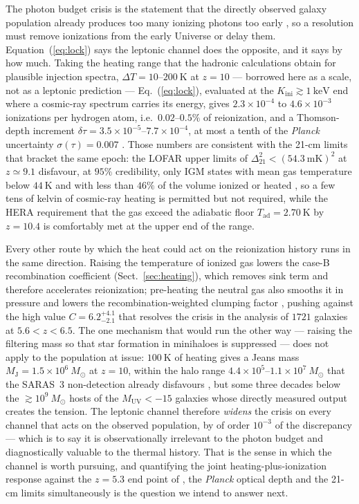 \documentclass[twocolumn]{article}
\newcommand{\Kini}{K_{\mathrm{ini}}}
\begin{document}
The photon budget crisis is the statement that the directly observed galaxy
population already produces too many ionizing photons too early
\citep{Munoz2024}, so a resolution must remove ionizations from the early
Universe or delay them. Equation~(\ref{eq:lock}) says the leptonic channel does
the opposite, and it says by how much. Taking the heating range that the
hadronic calculations obtain for plausible injection spectra,
$\Delta T = 10$--$200\ \mathrm{K}$ at $z = 10$ \citep{Leite2017} --- borrowed
here as a scale, not as a leptonic prediction --- Eq.~(\ref{eq:lock}),
evaluated at the $\Kini \gtrsim 1\ \mathrm{keV}$ end where a cosmic-ray
spectrum carries its energy, gives
$2.3\times10^{-4}$ to $4.6\times10^{-3}$ ionizations per hydrogen atom, i.e.\
$0.02$--$0.5\%$ of reionization, and a Thomson-depth increment
$\delta\tau = 3.5\times10^{-5}$--$7.7\times10^{-4}$, at most a tenth of the
\emph{Planck} uncertainty $\sigma(\tau) = 0.007$ \citep{Planck2020}. Those
numbers are consistent with the 21-cm limits that bracket the same epoch: the
LOFAR upper limits of $\Delta^2_{21} < (54.3\ \mathrm{mK})^2$ at $z \simeq 9.1$
\citep{Mertens2025} disfavour, at $95\%$ credibility, only IGM states with mean
gas temperature below $44\ \mathrm{K}$ and with less than $46\%$ of the volume
ionized or heated \citep{Ghara2025}, so a few tens of kelvin of cosmic-ray
heating is permitted but not required, while the HERA requirement that the gas
exceed the adiabatic floor $T_{\mathrm{ad}} = 2.70\ \mathrm{K}$ by
$z = 10.4$ \citep{HERA2023} is comfortably met at the upper end of the range.

Every other route by which the heat could act on the reionization history runs
in the same direction. Raising the temperature of ionized gas lowers the case-B
recombination coefficient (Sect.~\ref{sec:heating}), which removes sink term and
therefore accelerates reionization; pre-heating the neutral gas also smooths it
in pressure and lowers the recombination-weighted clumping factor
\citep{Pawlik2009}, pushing against the high value
$C = 6.2^{+4.1}_{-2.1}$ that resolves the crisis in the
\citet{Austin2025} analysis of $1721$ galaxies at $5.6 < z < 6.5$. The one
mechanism that would run the other way --- raising the filtering mass so that
star formation in minihaloes is suppressed --- does not apply to the population
at issue: $100\ \mathrm{K}$ of heating gives a Jeans mass
$M_{\mathrm{J}} = 1.5\times10^{6}\ M_\odot$ at $z = 10$, within the halo range
$4.4\times10^{5}$--$1.1\times10^{7}\ M_\odot$ that the SARAS~3 non-detection
already disfavours \citep{Bevins2022}, but some three decades below the
$\gtrsim\!10^{9}\ M_\odot$ hosts of the $M_{\mathrm{UV}} < -15$ galaxies whose
directly measured output creates the tension. The leptonic channel therefore
\emph{widens} the crisis on every channel that acts on the observed population,
by of order $10^{-3}$ of the discrepancy --- which is to say it is
observationally irrelevant to the photon budget and diagnostically valuable to
the thermal history. That is the sense in which the channel is worth pursuing,
and quantifying the joint heating-plus-ionization response against the
$z = 5.3$ end point of \citet{Bosman2022}, the \emph{Planck} optical depth and
the 21-cm limits simultaneously is the question we intend to answer next.
\end{document}
